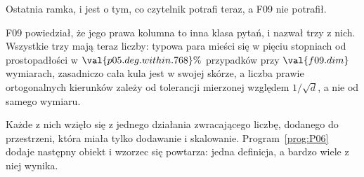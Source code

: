 \begin{fr}
Ostatnia ramka, i jest o tym, co czytelnik potrafi teraz, a F09 nie potrafił.

F09 powiedział, że jego prawa kolumna to inna klasa pytań, i nazwał trzy z
nich. Wszystkie trzy mają teraz liczby: typowa para mieści się w pięciu
stopniach od prostopadłości w $\val{p05.deg.within.768}\%$ przypadków przy
$\val{f09.dim}$ wymiarach, zasadniczo cała kula jest w swojej skórze, a liczba
prawie ortogonalnych kierunków zależy od tolerancji mierzonej względem
$1/\sqrt{d}$, a nie od samego wymiaru.

Każde z nich wzięło się z jednego działania zwracającego liczbę, dodanego do
przestrzeni, która miała tylko dodawanie i skalowanie. Program~\ref{prog:P06}
dodaje następny obiekt i wzorzec się powtarza: jedna definicja, a bardzo wiele
z niej wynika.
\end{fr}


